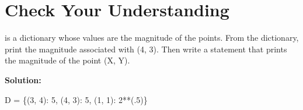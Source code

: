 \documentclass{article}
\newcommand{\icode}[1]{{\ttfamily #1}}
\begin{document}
\section{Check Your Understanding}
\noindent \icode{D} is a dictionary whose values are the magnitude of the points. From the dictionary, print the magnitude associated with (4, 3). Then write a statement that prints the magnitude of the point \icode{(X, Y)}.
\vspace{1 mm}

\noindent\textbf{Solution:}
\begin{tcolorbox}
	\ttfamily D = \{(3, 4): 5, (4, 3): 5, (1, 1): 2**(.5)\}\\
	\phantom{D[(4, 3)]}\\
	\phantom{print((X**2 + Y**2)**(0.5))}\\
	\vspace{3 cm}
	\phantom{u}
\end{tcolorbox}
\end{document}
